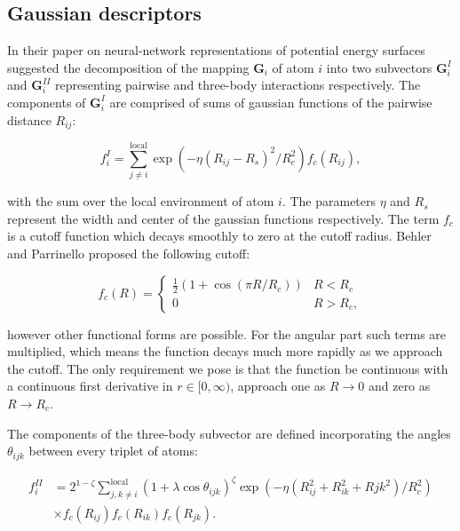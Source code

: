\subsection{Gaussian descriptors}
In their paper on neural-network representations of
potential energy surfaces \parencite[Behler, J\"{o}rg and
Parrinello, Michele]{behler2007generalized}
suggested the decomposition of the mapping $\bm{G}_i$ of atom $i$
into two subvectors $\bm{G}_i^I$ and $\bm{G}_i^{II}$ representing
pairwise and three-body interactions respectively.
The components of $\bm{G}_i^I$ are comprised of
sums of gaussian functions of the pairwise distance $R_{ij}$:

\begin{equation}
 f_i^I = \sum_{j \neq i}^{\text{local}}
    \exp \left( -\eta(R_{ij} - R_s)^2 / R_c^2 \right) f_c (R_{ij}) , 
\end{equation}

with the sum over the local environment of atom $i$.
The parameters $\eta$ and $R_s$ represent the width and center
of the gaussian functions respectively. The term $f_c$
is a cutoff function which decays smoothly to zero
at the cutoff radius. Behler and Parrinello proposed
the following cutoff:

\begin{equation}
    f_c(R) =
\begin{cases}
    \frac{1}{2}\left(1 + \cos \left(\pi R / R_c \right) \right) & R < R_c \\
    0 & R > R_c ,
\end{cases}
\end{equation}

however other functional forms are possible. For the angular part
such terms are multiplied, which means the function decays much more
rapidly as we approach the cutoff. The only requirement we pose
is that the function be continuous with a continuous first derivative
in $r \in [0, \infty)$,
approach one as $R \rightarrow 0$
and zero as $R \rightarrow R_c$.
\par
The components of the three-body subvector are defined incorporating
the angles $\theta_{ijk}$ between every triplet of atoms:

\begin{equation}
\begin{split}
    f_i^{II} &= 2^{1 - \zeta} \sum_{j,k \neq i}^{\text{local}}
    (1 + \lambda \cos \theta_{ijk})^{\zeta}
    \exp \left( -\eta \left( R_{ij}^2 + R_{ik}^2 + R{jk}^2
    \right) / R_c^2 \right) \\
    & \times f_c(R_{ij}) f_c(R_{ik}) f_c(R_{jk}) .
\end{split}
\end{equation}

